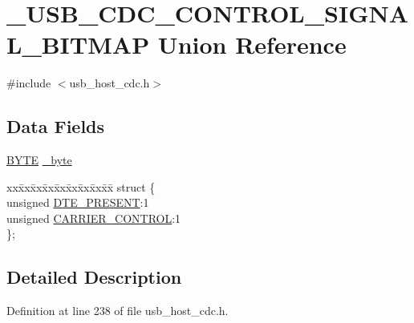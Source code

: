 \hypertarget{union___u_s_b___c_d_c___c_o_n_t_r_o_l___s_i_g_n_a_l___b_i_t_m_a_p}{}\section{\+\_\+\+U\+S\+B\+\_\+\+C\+D\+C\+\_\+\+C\+O\+N\+T\+R\+O\+L\+\_\+\+S\+I\+G\+N\+A\+L\+\_\+\+B\+I\+T\+M\+A\+P Union Reference}
\label{union___u_s_b___c_d_c___c_o_n_t_r_o_l___s_i_g_n_a_l___b_i_t_m_a_p}


{\ttfamily \#include $<$usb\+\_\+host\+\_\+cdc.\+h$>$}

\subsection*{Data Fields}
\begin{DoxyCompactItemize}
\item 
\hyperlink{_generic_type_defs_8h_a4ae1dab0fb4b072a66584546209e7d58}{B\+Y\+T\+E} \hyperlink{union___u_s_b___c_d_c___c_o_n_t_r_o_l___s_i_g_n_a_l___b_i_t_m_a_p_aad6b25752650539bbd15773c4b71b4d4}{\+\_\+byte}
\item 
\begin{tabbing}
xx\=xx\=xx\=xx\=xx\=xx\=xx\=xx\=xx\=\kill
struct \{\\
\>unsigned \hyperlink{union___u_s_b___c_d_c___c_o_n_t_r_o_l___s_i_g_n_a_l___b_i_t_m_a_p_abd62ba5a2ebbfe1cf985381168371760}{DTE\_PRESENT}:1\\
\>unsigned \hyperlink{union___u_s_b___c_d_c___c_o_n_t_r_o_l___s_i_g_n_a_l___b_i_t_m_a_p_a289dfd86f16d9b6a29432803e55d2236}{CARRIER\_CONTROL}:1\\
\}; \\

\end{tabbing}\end{DoxyCompactItemize}


\subsection{Detailed Description}


Definition at line 238 of file usb\+\_\+host\+\_\+cdc.\+h.



